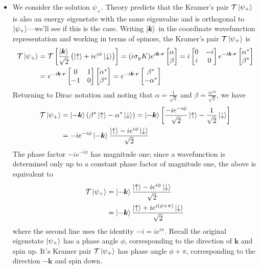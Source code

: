 \documentclass[11pt, a4paper]{article}
\renewcommand{\vec}[1]{\bm{#1}} %
\newcommand{\ua}{\uparrow}  %
\newcommand{\da}{\downarrow}  %
\renewcommand{\k}{\vec{k}}  %
\newcommand{\T}{\mathcal{T}}  %
\begin{document}
\begin{itemize}
	\item We consider the solution $ \psi_{+} $. Theory predicts that the Kramer's pair $ \T \ket{\psi_{+}} $ is also an energy eigenstate with the same eigenvalue and is orthogonal to $ \ket{\psi_{+}} $---we'll see if this is the case. Writing $ \ket{\k} $ in the coordinate wavefunction representation and working in terms of spinors, the Kramer's pair $ \T \ket{\psi_{+}} $ is
	\begin{align*}
		\T \ket{\psi_{+}} & = \T \left[\frac{\ket{\k}}{\sqrt{2}}\left(\ket{\ua} + ie^{i\phi}\ket{\da}\right) \right]= (i \sigma_{y}K)e^{i\k\cdot \vec{r}} 
		\begin{bmatrix}
			\alpha\\
			\beta
		\end{bmatrix}
		= 
		i 
		\begin{bmatrix}
			0 & -i\\
			i & 0
		\end{bmatrix}
		e^{-i\k\cdot \vec{r}} 
		\begin{bmatrix}
			\alpha^{*}\\
			\beta^{*}
		\end{bmatrix}
		\\
		&= 
		e^{-i\k\cdot \vec{r}} 
		\begin{bmatrix}
			0 & 1\\
			-1 & 0
		\end{bmatrix}
		\begin{bmatrix}
			\alpha^{*}\\
			\beta^{*}
		\end{bmatrix}
		 = e^{-i\k\cdot \vec{r}} 
		\begin{bmatrix}
			\beta^{*}\\
			-\alpha^{*}
		\end{bmatrix}
	\end{align*}
	Returning to Dirac notation and noting that $ \alpha = \frac{1}{\sqrt{2}} $ and $ \beta = \frac{ie^{i\phi}}{\sqrt{2}} $, we have
	\begin{align*}
		\T \ket{\psi_{+}} &= \ket{-\k}  \left(\beta^{*} \ket{\ua} - \alpha^{*}\ket{\da}\right) = \ket{-\k} \left[\frac{-ie^{-i\phi}}{\sqrt{2}}\ket{\ua} - \frac{1}{\sqrt{2}}\ket{\da}\right] \\
		&= -ie^{-i\phi}\ket{-\k} \frac{\ket{\ua} - i e^{i\phi}\ket{\da}}{\sqrt{2}}
	\end{align*}
	The phase factor $ -ie^{-i\phi} $ has magnitude one; since a wavefunction is determined only up to a constant phase factor of magnitude one, the above is equivalent to
	\begin{align*}
		\T \ket{\psi_{+}} &= \ket{-\k} \frac{\ket{\ua} - i e^{i\phi}\ket{\da}}{\sqrt{2}}\\
		&=\ket{-\k} \frac{\ket{\ua} + i e^{i(\phi + \pi)}\ket{\da}}{\sqrt{2}}
	\end{align*}
	where the second line uses the identity $ -i = ie^{i\pi} $. Recall the original eigenstate $ \ket{\psi_{+}} $ has a phase angle $ \phi $, corresponding to the direction of $ \k $ and spin up. It's Kramer pair $ \T\ket{\psi_{+}} $ has phase angle $ \phi + \pi $, corresponding to the direction $ -\k $ and spin down. 
\end{itemize}
	
\end{document}
